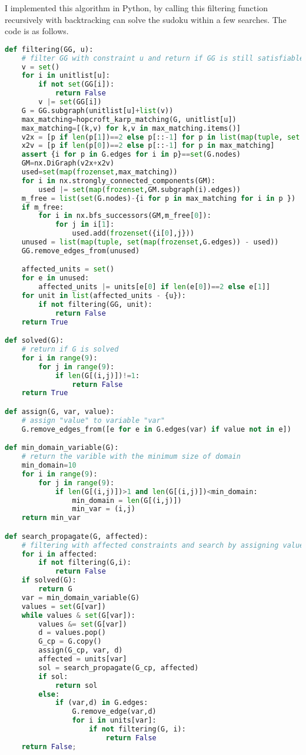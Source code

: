 \documentclass[a4paper, 12pt]{report}
\begin{document}
            I implemented this algorithm in Python, by calling this filtering function recursively with backtracking can solve the sudoku within a few searches. The code is as follows.
            \begin{lstlisting}[frame=single, language=python]
def filtering(GG, u):
    # filter GG with constraint u and return if GG is still satisfiable
    v = set()
    for i in unitlist[u]:
        if not set(GG[i]):
            return False
        v |= set(GG[i])
    G = GG.subgraph(unitlist[u]+list(v))
    max_matching=hopcroft_karp_matching(G, unitlist[u])
    max_matching=[(k,v) for k,v in max_matching.items()]
    v2x = [p if len(p[1])==2 else p[::-1] for p in list(map(tuple, set(map(frozenset,G.edges)) - set(map(frozenset,max_matching))))]
    x2v = [p if len(p[0])==2 else p[::-1] for p in max_matching]
    assert {i for p in G.edges for i in p}==set(G.nodes)
    GM=nx.DiGraph(v2x+x2v)
    used=set(map(frozenset,max_matching))
    for i in nx.strongly_connected_components(GM):
        used |= set(map(frozenset,GM.subgraph(i).edges))
    m_free = list(set(G.nodes)-{i for p in max_matching for i in p })
    if m_free:
        for i in nx.bfs_successors(GM,m_free[0]):
            for j in i[1]:
                used.add(frozenset({i[0],j}))
    unused = list(map(tuple, set(map(frozenset,G.edges)) - used))
    GG.remove_edges_from(unused)

    affected_units = set()
    for e in unused:
        affected_units |= units[e[0] if len(e[0])==2 else e[1]]
    for unit in list(affected_units - {u}):
        if not filtering(GG, unit):
            return False
    return True

def solved(G):
    # return if G is solved
    for i in range(9):
        for j in range(9):
            if len(G[(i,j)])!=1:
                return False
    return True

def assign(G, var, value):
    # assign "value" to variable "var"
    G.remove_edges_from([e for e in G.edges(var) if value not in e])

def min_domain_variable(G):
    # return the varible with the minimum size of domain
    min_domain=10
    for i in range(9):
        for j in range(9):
            if len(G[(i,j)])>1 and len(G[(i,j)])<min_domain:
                min_domain = len(G[(i,j)])
                min_var = (i,j)
    return min_var

def search_propagate(G, affected):
    # filtering with affected constraints and search by assigning value and propagate, return solution if exists, otherwise return False
    for i in affected:
        if not filtering(G,i):
            return False
    if solved(G):
        return G
    var = min_domain_variable(G)
    values = set(G[var])
    while values & set(G[var]):
        values &= set(G[var])
        d = values.pop()
        G_cp = G.copy()
        assign(G_cp, var, d)
        affected = units[var]
        sol = search_propagate(G_cp, affected)
        if sol:
            return sol
        else:
            if (var,d) in G.edges:
                G.remove_edge(var,d)
                for i in units[var]:
                    if not filtering(G, i):
                        return False
    return False;
            \end{lstlisting}
            
\end{document}

